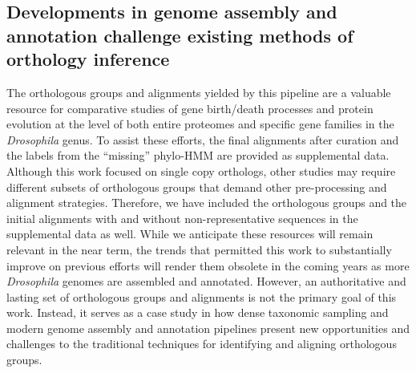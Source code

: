 \subsection{Developments in genome assembly and annotation challenge existing methods of orthology inference}
The orthologous groups and alignments yielded by this pipeline are a valuable resource for comparative studies of gene birth/death processes and protein evolution at the level of both entire proteomes and specific gene families in the \textit{Drosophila} genus. To assist these efforts, the final alignments after curation and the labels from the ``missing'' phylo-HMM are provided as supplemental data. Although this work focused on single copy orthologs, other studies may require different subsets of orthologous groups that demand other pre-processing and alignment strategies. Therefore, we have included the orthologous groups and the initial alignments with and without non-representative sequences in the supplemental data as well. While we anticipate these resources will remain relevant in the near term, the trends that permitted this work to substantially improve on previous efforts will render them obsolete in the coming years as more \textit{Drosophila} genomes are assembled and annotated. However, an authoritative and lasting set of orthologous groups and alignments is not the primary goal of this work. Instead, it serves as a case study in how dense taxonomic sampling and modern genome assembly and annotation pipelines present new opportunities and challenges to the traditional techniques for identifying and aligning orthologous groups.

